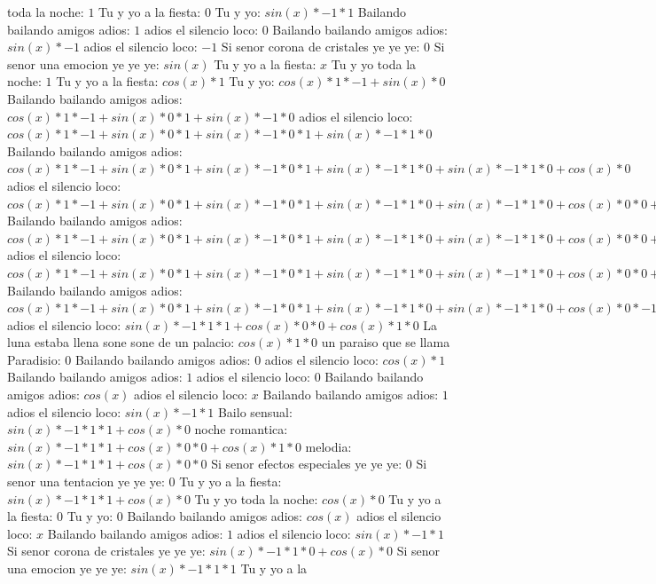 \documentclass{article}
\begin{document}
toda la noche: $1$ Tu y yo a la fiesta: $0$  \newline Tu y yo: $sin(x)*-1*1$ Bailando bailando amigos adios: $1$ adios el silencio loco: $0$  \newline Bailando bailando amigos adios: $sin(x)*-1$ adios el silencio loco: $-1$ Si senor corona de cristales ye ye ye: $0$  \newline Si senor una emocion ye ye ye: $sin(x)$  \newline Tu y yo a la fiesta: $x$ Tu y yo toda la noche: $1$  \newline Tu y yo a la fiesta: $cos(x)*1$ Tu y yo: $cos(x)*1*-1+sin(x)*0$ Bailando bailando amigos adios: ${cos(x)*1*-1+sin(x)*0}*1+sin(x)*-1*0$ adios el silencio loco: ${{cos(x)*1*-1+sin(x)*0}*1+sin(x)*-1*0}*1+sin(x)*-1*1*0$ Bailando bailando amigos adios: ${{cos(x)*1*-1+sin(x)*0}*1+sin(x)*-1*0}*1+sin(x)*-1*1*0+sin(x)*-1*1*0+cos(x)*0$ adios el silencio loco: ${{{cos(x)*1*-1+sin(x)*0}*1+sin(x)*-1*0}*1+sin(x)*-1*1*0+sin(x)*-1*1*0+cos(x)*0}*0+{sin(x)*-1*1*1+cos(x)*0}*0$ Bailando bailando amigos adios: ${{{cos(x)*1*-1+sin(x)*0}*1+sin(x)*-1*0}*1+sin(x)*-1*1*0+sin(x)*-1*1*0+cos(x)*0}*0+{sin(x)*-1*1*1+cos(x)*0}*0+{sin(x)*-1*1*1+cos(x)*0}*0+cos(x)*1*0$ adios el silencio loco: ${{{cos(x)*1*-1+sin(x)*0}*1+sin(x)*-1*0}*1+sin(x)*-1*1*0+sin(x)*-1*1*0+cos(x)*0}*0+{sin(x)*-1*1*1+cos(x)*0}*0+{sin(x)*-1*1*1+cos(x)*0}*0+cos(x)*1*0+{sin(x)*-1*1*1+cos(x)*0}*0+cos(x)*1*0+cos(x)*1*0+sin(x)*0$ Bailando bailando amigos adios: ${{{cos(x)*1*-1+sin(x)*0}*1+sin(x)*-1*0}*1+sin(x)*-1*1*0+sin(x)*-1*1*0+cos(x)*0}*-1+{sin(x)*-1*1*1+cos(x)*0}*0+{sin(x)*-1*1*1+cos(x)*0}*0+cos(x)*1*0$  \newline adios el silencio loco: ${sin(x)*-1*1*1+cos(x)*0}*0+cos(x)*1*0$  \newline La luna estaba llena sone sone de un palacio: $cos(x)*1*0$ un paraiso que se llama Paradisio: $0$ Bailando bailando amigos adios: $0$  \newline adios el silencio loco: $cos(x)*1$ Bailando bailando amigos adios: $1$ adios el silencio loco: $0$  \newline Bailando bailando amigos adios: $cos(x)$  \newline adios el silencio loco: $x$ Bailando bailando amigos adios: $1$  \newline adios el silencio loco: $sin(x)*-1*1$ Bailo sensual: $sin(x)*-1*1*1+cos(x)*0$ noche romantica: ${sin(x)*-1*1*1+cos(x)*0}*0+cos(x)*1*0$ melodia: ${sin(x)*-1*1*1+cos(x)*0}*0$ Si senor efectos especiales ye ye ye: $0$ Si senor una tentacion ye ye ye: $0$  \newline Tu y yo a la fiesta: $sin(x)*-1*1*1+cos(x)*0$  \newline Tu y yo toda la noche: $cos(x)*0$ Tu y yo a la fiesta: $0$ Tu y yo: $0$  \newline Bailando bailando amigos adios: $cos(x)$  \newline adios el silencio loco: $x$ Bailando bailando amigos adios: $1$  \newline adios el silencio loco: $sin(x)*-1*1$ Si senor corona de cristales ye ye ye: $sin(x)*-1*1*0+cos(x)*0$ Si senor una emocion ye ye ye: $sin(x)*-1*1*1$ Tu y yo a la 
\end{document}
